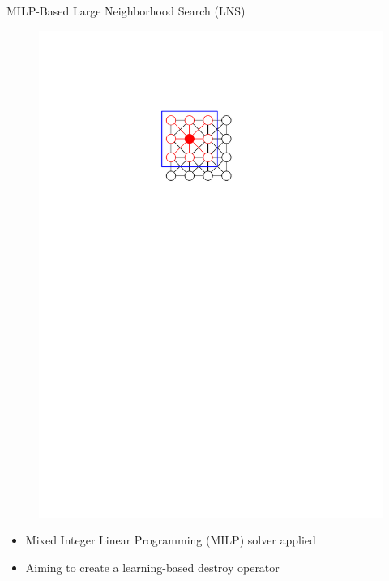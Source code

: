 \documentclass[aspectratio=1610]{beamer}
\newcommand{\important}[1]{{\color{green!60!black}#1}}
\begin{document}
\begin{frame}{MILP-Based Large Neighborhood Search (LNS)}
\begin{figure}
\begin{overprint}
			\centering\includegraphics[width=\textwidth, page=9]{figures/graphics.pdf}
		\end{overprint}
	\end{figure}
	\begin{itemize}
		\item {} Mixed Integer Linear Programming (MILP) solver applied
		\item<2> Aiming to create a \important{learning-based destroy operator}
	\end{itemize}
\end{frame}

	
\end{document}
